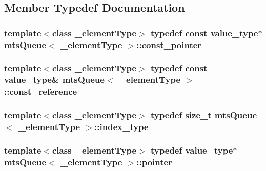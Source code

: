 \subsection{Member Typedef Documentation}
\hypertarget{classmts_queue_a1224d9a0146fab27bdb1db050288acb4}{}
\subsubsection[{const\+\_\+pointer}]{\setlength{\rightskip}{0pt plus 5cm}template$<$class \+\_\+element\+Type$>$ typedef const {\bf value\+\_\+type}$\ast$ {\bf mts\+Queue}$<$ \+\_\+element\+Type $>$\+::{\bf const\+\_\+pointer}}\label{classmts_queue_a1224d9a0146fab27bdb1db050288acb4}
\hypertarget{classmts_queue_a3ae67f8b6cdb9686e5fca9ed1740290e}{}
\subsubsection[{const\+\_\+reference}]{\setlength{\rightskip}{0pt plus 5cm}template$<$class \+\_\+element\+Type$>$ typedef const {\bf value\+\_\+type}\& {\bf mts\+Queue}$<$ \+\_\+element\+Type $>$\+::{\bf const\+\_\+reference}}\label{classmts_queue_a3ae67f8b6cdb9686e5fca9ed1740290e}
\hypertarget{classmts_queue_a2ddbc96d89691532f84001deeaa19ffe}{}
\subsubsection[{index\+\_\+type}]{\setlength{\rightskip}{0pt plus 5cm}template$<$class \+\_\+element\+Type$>$ typedef size\+\_\+t {\bf mts\+Queue}$<$ \+\_\+element\+Type $>$\+::{\bf index\+\_\+type}}\label{classmts_queue_a2ddbc96d89691532f84001deeaa19ffe}
\hypertarget{classmts_queue_a66d423ede5c12e015a4e070e1bc23f43}{}
\subsubsection[{pointer}]{\setlength{\rightskip}{0pt plus 5cm}template$<$class \+\_\+element\+Type$>$ typedef {\bf value\+\_\+type}$\ast$ {\bf mts\+Queue}$<$ \+\_\+element\+Type $>$\+::{\bf pointer}}\label{classmts_queue_a66d423ede5c12e015a4e070e1bc23f43}
\hypertarget{classmts_queue_ac59cdd255fe34f580085d58030887439}{}
